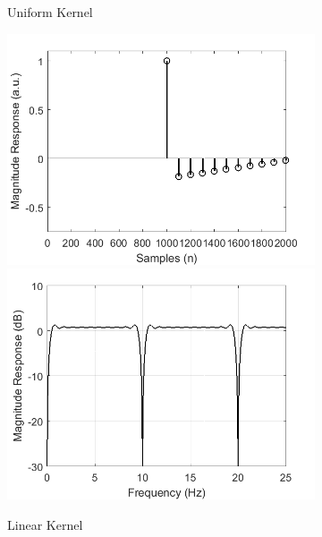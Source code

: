 \documentclass[a4paper]{article}
\begin{document}
\begin{figure}[hbtp]
\begin{subfigure}{.245\textwidth}
        \caption{Uniform Kernel}\label{fig:AverageKernel}
    \end{subfigure}
    \begin{subfigure}{.245\textwidth}
        \includegraphics[width=\textwidth]{img/kernel_linear.png}\\
        \includegraphics[width=\textwidth]{img/mag_linear.png}
        \caption{Linear Kernel}\label{fig:LinearKernel}
    \end{subfigure}
    \begin{subfigure}{.245\textwidth}

\end{subfigure}
\end{figure}
\end{document}

